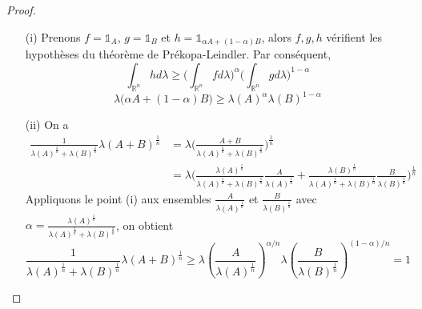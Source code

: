 \documentclass[12pt]{article}
\theoremstyle{definition}
\begin{document}
\begin{proof}
	\begin{enumerate}
		\item[(i)] Prenons $f=\mathbb{1}_A$, $g=\mathbb{1}_B$ et $h=\mathbb{1}_{\alpha A+(1-\alpha)B}$, alors $f,g,h$ vérifient les hypothèses du théorème de Prékopa-Leindler. Par conséquent,
		\begin{equation*}
		\int_{\mathbb{R}^n}hd\lambda \geq \Big(\int_{\mathbb{R}^n}fd\lambda\Big)^{\alpha} \Big(\int_{\mathbb{R}^n}gd\lambda\Big)^{1-\alpha}
		\end{equation*}
		\begin{equation*}
		\lambda\big(\alpha A+(1-\alpha)B\big) \geq \lambda(A)^{\alpha} \lambda(B)^{1-\alpha}
		\end{equation*}
		\item[(ii)] On a
		\begin{align*}
		\frac{1}{\lambda(A)^{\frac{1}{n}}+\lambda(B)^{\frac{1}{n}}}\lambda(A+B)^{\frac{1}{n}}&=\lambda\Big(\frac{A+B}{\lambda(A)^{\frac{1}{n}}+\lambda(B)^{\frac{1}{n}}}\Big)^{\frac{1}{n}}\\
		&=\lambda\Big(\frac{\lambda(A)^\frac{1}{n}}{\lambda(A)^{\frac{1}{n}}+\lambda(B)^{\frac{1}{n}}}\frac{A}{\lambda(A)^\frac{1}{n}}+\frac{\lambda(B)^\frac{1}{n}}{\lambda(A)^{\frac{1}{n}}+\lambda(B)^{\frac{1}{n}}}\frac{B}{\lambda(B)^\frac{1}{n}}\Big)^\frac{1}{n}
		\end{align*}
		Appliquons le point (i) aux ensembles $\frac{A}{\lambda(A)^{\frac{1}{n}}}$ et $\frac{B}{\lambda(B)^{\frac{1}{n}}}$ avec $\alpha = \frac{\lambda(A)^\frac{1}{n}}{\lambda(A)^{\frac{1}{n}}+\lambda(B)^{\frac{1}{n}}}$, on obtient 
		\begin{equation*}
		\frac{1}{\lambda(A)^{\frac{1}{n}}+\lambda(B)^{\frac{1}{n}}}\lambda(A+B)^{\frac{1}{n}}\geq \lambda\left(\frac{A}{\lambda(A)^\frac{1}{n}}\right)^{\alpha/n} \lambda\left(\frac{B}{\lambda(B)^\frac{1}{n}}\right)^{(1-\alpha)/n}=1
		\end{equation*}
	\end{enumerate}
\end{proof}
\end{document}
